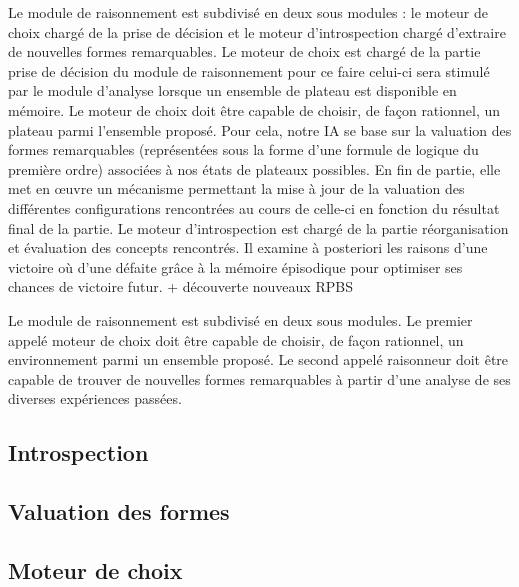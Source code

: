 
Le module de raisonnement est subdivisé en deux sous modules : le \og moteur de choix \fg{} chargé de la prise de décision et le \og moteur d'introspection \fg{} chargé d'extraire de nouvelles formes remarquables.
Le moteur de choix est chargé de la partie  prise de décision du module  de raisonnement pour ce faire celui-ci sera \og stimulé \fg{} par le module d'analyse lorsque un ensemble de plateau est disponible en mémoire. Le moteur de choix doit être capable de choisir, de façon rationnel, un plateau parmi l'ensemble proposé. Pour cela, notre IA se base sur la valuation des formes remarquables (représentées sous la forme d'une formule de logique du première ordre) associées à  nos  états de plateaux possibles. En fin de partie, elle met en œuvre un mécanisme permettant la mise à jour de la valuation des différentes \og configurations \fg{} rencontrées au cours de celle-ci en fonction du résultat final de la partie.
Le moteur d'introspection est chargé de la  partie réorganisation et évaluation des \og concepts \fg{} rencontrés. Il  examine à posteriori les raisons d'une victoire où d'une défaite grâce à  la mémoire épisodique pour optimiser ses chances de victoire futur. {+ découverte nouveaux RPBS}

Le module de raisonnement est subdivisé en deux sous modules. Le premier appelé \og moteur de choix \fg{} doit être capable de choisir, de façon rationnel, un environnement parmi un ensemble proposé. Le second appelé \og raisonneur \fg{} doit être capable de trouver de nouvelles formes remarquables à partir d'une analyse de ses diverses expériences passées.


\subsection{Introspection}



\subsection{Valuation des formes}



\subsection{Moteur de choix}



